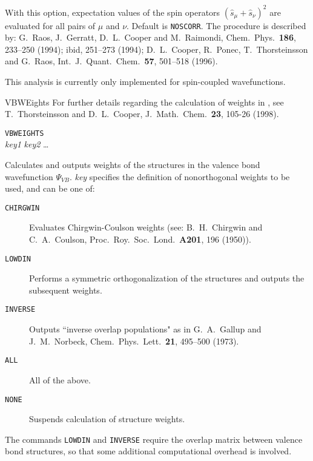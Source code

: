 \begin{keywordlist}
With this option, expectation values of the spin operators
$(\hat{s}_\mu+\hat{s}_\nu)^2$ are evaluated for all pairs of $\mu$ and
$\nu$. Default is {\tt NOSCORR}. The procedure is described by: G.~Raos,
J.~Gerratt, D.~L.~Cooper and M.~Raimondi,
Chem.\ Phys.\ {\bf 186}, 233--250 (1994); ibid, 251--273 (1994);
D.~L.~Cooper, R.~Ponec, T.~Thorsteinsson and G.~Raos,
Int.\ J.\ Quant.\ Chem.\ {\bf 57}, 501--518 (1996).

This analysis is currently only implemented for spin-coupled wavefunctions.
\item[VBWEights]
For further details regarding the calculation of weights in , see
T.~Thorsteinsson and D.~L.~Cooper, J.\ Math.\ Chem.\ {\bf 23}, 105-26 (1998).

{\tt VBWEIGHTS}\\
{\em key1} {\em key2} \ldots
{}

Calculates and outputs weights of the structures in the valence bond
wavefunction $\Psi_{VB}$. {\em key\/} specifies the definition of
nonorthogonal weights to be used, and can be one of:
\begin{description}
\item[{\tt CHIRGWIN}] Evaluates Chirgwin-Coulson weights (see:
B.~H.~Chirgwin and C.~A.~Coulson, Proc.\ Roy.\ Soc.\ Lond.\ {\bf A201},
196 (1950)).
\item[{\tt LOWDIN}] Performs a symmetric orthogonalization of the
structures and outputs the subsequent weights.
\item[{\tt INVERSE}] Outputs ``inverse overlap populations" as in
G.~A.~Gallup and J.~M.~Norbeck, Chem.\ Phys.\ Lett.\ {\bf 21}, 495--500 (1973).
\item[{\tt ALL}] All of the above.
\item[{\tt NONE}] Suspends calculation of structure weights.
\end{description}
The commands {\tt LOWDIN} and {\tt INVERSE} require the overlap matrix
between valence bond structures, so that some additional computational
overhead is involved.
\end{keywordlist}


